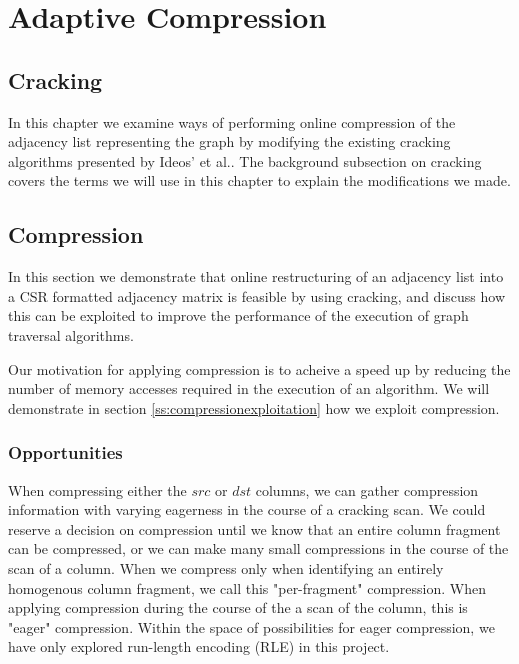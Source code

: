 \chapter{Adaptive Compression}

\label{ch:adaptivecompression}

\section{Cracking}

In this chapter we examine ways of performing online compression of the adjacency list representing
the graph by modifying the existing cracking algorithms presented by Ideos' et al.. The background
subsection on cracking covers the terms we will use in this chapter to explain the modifications we
made.

\section{Compression}

In this section we demonstrate that online restructuring of an adjacency list into a CSR formatted 
adjacency matrix is feasible by using cracking, and discuss how this can be exploited to improve the
performance of the execution of graph traversal algorithms.

Our motivation for applying compression is to acheive a speed up by reducing the number of memory
accesses required in the execution of an algorithm. We will demonstrate in section
\ref{ss:compressionexploitation} how we exploit compression.

\subsection{Opportunities}

When compressing either the $src$ or $dst$ columns, we can gather compression information with
varying eagerness in the course of a cracking scan. We could reserve a decision on compression until
we know that an entire column fragment can be compressed, or we can make many small compressions in
the course of the scan of a column. When we compress only when identifying an entirely homogenous
column fragment, we call this "per-fragment" compression. When applying compression during the course
of the a scan of the column, this is "eager" compression. Within the space of possibilities for
eager compression, we have only explored run-length encoding (RLE) in this project.

